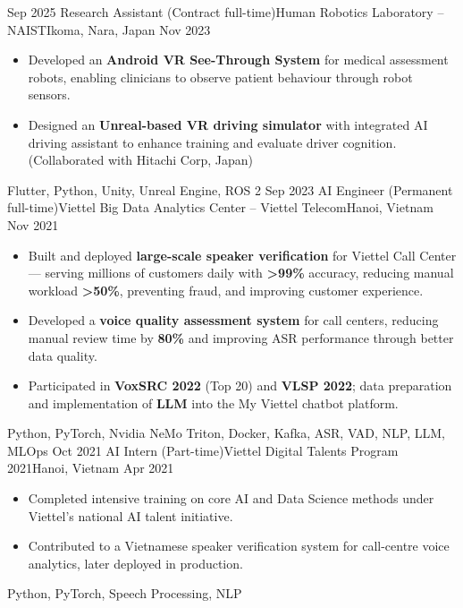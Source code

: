 \begin{experiences}
  \emptySeparator
  \experience
    {Sep 2025}      {Research Assistant (Contract full-time)}{Human Robotics Laboratory -- NAIST}{Ikoma, Nara, Japan}
    {Nov 2023}      {
                      \begin{itemize}
                        \item Developed an \textbf{Android VR See-Through System} for medical assessment robots, enabling clinicians to observe patient behaviour through robot sensors.
                        \item Designed an \textbf{Unreal-based VR driving simulator} with integrated AI driving assistant to enhance training and evaluate driver cognition. (Collaborated with Hitachi Corp, Japan)
                      \end{itemize}
                    }
                    {Flutter, Python, Unity, Unreal Engine, ROS 2}
  \emptySeparator
  \experience
    {Sep 2023}      {AI Engineer (Permanent full-time)}{Viettel Big Data Analytics Center -- Viettel Telecom}{Hanoi, Vietnam}
    {Nov 2021}      {
                      \begin{itemize}
                        \item Built and deployed \textbf{large-scale speaker verification} for Viettel Call Center --- serving millions of customers daily with \textbf{>99\%} accuracy, reducing manual workload \textbf{>50\%}, preventing fraud, and improving customer experience.
                        \item Developed a \textbf{voice quality assessment system} for call centers, reducing manual review time by \textbf{80\%} and improving ASR performance through better data quality.
                        \item Participated in \textbf{VoxSRC 2022} (Top 20) and \textbf{VLSP 2022}; data preparation and implementation of \textbf{LLM} into the My Viettel chatbot platform.
                      \end{itemize}
                    }
                    {Python, PyTorch, Nvidia NeMo Triton, Docker, Kafka, ASR, VAD, NLP, LLM, MLOps}
  \emptySeparator
  \experience
    {Oct 2021}      {AI Intern (Part-time)}{Viettel Digital Talents Program 2021}{Hanoi, Vietnam}
    {Apr 2021}      {
                      \begin{itemize}
                        \item Completed intensive training on core AI and Data Science methods under Viettel's national AI talent initiative.
                        \item Contributed to a Vietnamese speaker verification system for call-centre voice analytics, later deployed in production.
                      \end{itemize}
                    }
                    {Python, PyTorch, Speech Processing, NLP}
\end{experiences}
